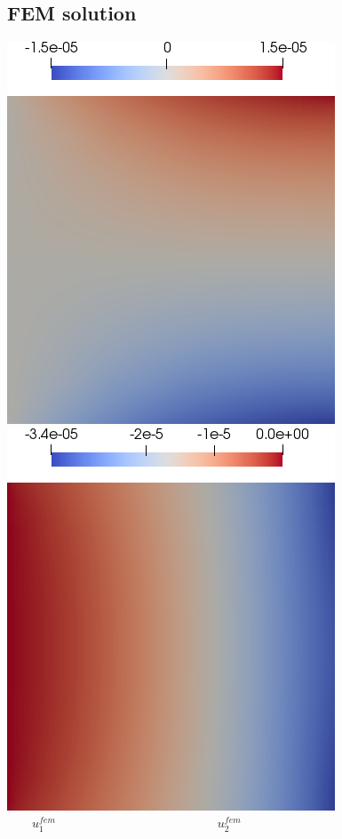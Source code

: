\documentclass[compress,pdf,mathserif]{beamer}
\begin{document}
\subsection{FEM solution}
\begin{frame}
    \centering
    \includegraphics[width=0.45\linewidth]{data/ux.png} \hspace{1em}
    \includegraphics[width=0.45\linewidth]{data/uy.png}\\
    $\hspace{2em} u_1^{fem} \hspace{13em} u_2^{fem}$
\end{frame}
\end{document}
